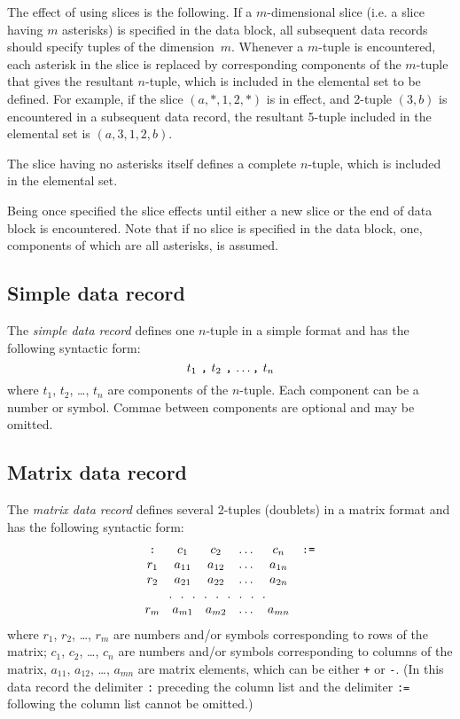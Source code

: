 \documentclass[11pt]{report}
\begin{document}
The effect of using slices is the following. If a $m$-dimensional slice
(i.e. a slice having $m$ asterisks) is specified in the data block, all
subsequent data records should specify tuples of the dimension~$m$.
Whenever a $m$-tuple is encountered, each asterisk in the slice is
replaced by corresponding components of the $m$-tuple that gives the
resultant $n$-tuple, which is included in the elemental set to be
defined. For example, if the slice $(a,*,1,2,*)$ is in effect, and
2-tuple $(3,b)$ is encountered in a subsequent data record, the
resultant 5-tuple included in the elemental set is $(a,3,1,2,b)$.

The slice having no asterisks itself defines a complete $n$-tuple,
which is included in the elemental set.

Being once specified the slice effects until either a new slice or the
end of data block is encountered. Note that if no slice is specified in
the data block, one, components of which are all asterisks, is assumed.

\subsection{Simple data record}

The {\it simple data record} defines one $n$-tuple in a simple format
and has the following syntactic form:
$$\mbox{$t_1$ {\tt,} $t_2$ {\tt,} \dots {\tt,} $t_n$}$$
where $t_1$, $t_2$, \dots, $t_n$ are components of the $n$-tuple. Each
component can be a number or symbol. Commae between components are
optional and may be omitted.

\subsection{Matrix data record}

The {\it matrix data record} defines several 2-tuples (doublets) in
a matrix format and has the following syntactic form:
$$\begin{array}{cccccc}
\mbox{{\tt:}}&c_1&c_2&\dots&c_n&\mbox{{\tt:=}}\\
r_1&a_{11}&a_{12}&\dots&a_{1n}&\\
r_2&a_{21}&a_{22}&\dots&a_{2n}&\\
\multicolumn{5}{c}{.\ \ .\ \ .\ \ .\ \ .\ \ .\ \ .\ \ .\ \ .}&\\
r_m&a_{m1}&a_{m2}&\dots&a_{mn}&\\
\end{array}$$
where $r_1$, $r_2$, \dots, $r_m$ are numbers and/or symbols
corresponding to rows of the matrix; $c_1$, $c_2$, \dots, $c_n$ are
numbers and/or symbols corresponding to columns of the matrix, $a_{11}$,
$a_{12}$, \dots, $a_{mn}$ are matrix elements, which can be either
{\tt+} or {\tt-}. (In this data record the delimiter {\tt:} preceding
the column list and the delimiter {\tt:=} following the column list
cannot be omitted.)
\end{document}
